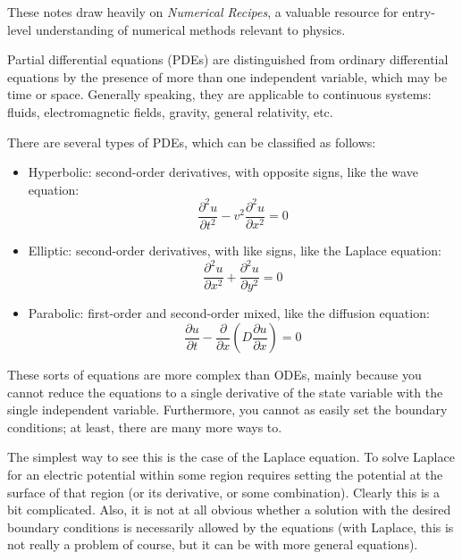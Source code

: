 These notes draw heavily on {\it Numerical Recipes}, a valuable
resource for entry-level understanding of numerical methods relevant
to physics.

Partial differential equations (PDEs) are distinguished from ordinary
differential equations by the presence of more than one independent
variable, which may be time or space. Generally speaking, they are
applicable to continuous systems: fluids, electromagnetic fields,
gravity, general relativity, etc. 

There are several types of PDEs, which can be classified as follows:
\begin{itemize}
\item Hyperbolic: second-order derivatives, with opposite signs, like
  the wave equation:
  \begin{equation}
\frac{\partial^2 u}{\partial t^2} - v^2 \frac{\partial^2 u}{\partial
  x^2} = 0
  \end{equation}
\item Elliptic: second-order derivatives, with like signs, like the
  Laplace equation:
  \begin{equation}
\frac{\partial^2 u}{\partial x^2} + \frac{\partial^2 u}{\partial
  y^2} = 0
  \end{equation}
\item Parabolic: first-order and second-order mixed, like the
  diffusion equation:
  \begin{equation}
\frac{\partial u}{\partial t} - \frac{\partial}{\partial
  x}\left(D\frac{\partial u}{\partial x}\right) = 0
  \end{equation}
\end{itemize}

These sorts of equations are more complex than ODEs, mainly because
you cannot reduce the equations to a single derivative of the state
variable with the single independent variable. Furthermore, you cannot
as easily set the boundary conditions; at least, there are many more
ways to. 

The simplest way to see this is the case of the Laplace equation. To
solve Laplace for an electric potential within some region requires
setting the potential at the surface of that region (or its
derivative, or some combination). Clearly this is a bit
complicated. Also, it is not at all obvious whether a solution with
the desired boundary conditions is necessarily allowed by the
equations (with Laplace, this is not really a problem of course, but
it can be with more general equations).


